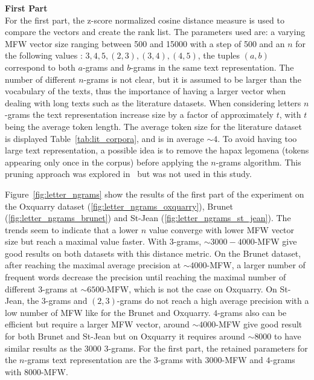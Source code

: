 \textbf{First Part}\\
For the first part, the z-score normalized cosine distance measure is used to compare the vectors and create the rank list.
The parameters used are: a varying MFW vector size ranging between 500 and 15000 with a step of 500 and an $n$ for the following values : $3, 4, 5, (2, 3), (3, 4), (4, 5)$, the tuples $(a, b)$ correspond to both $a$-grams and $b$-grams in the same text representation.
The number of different $n$-grams is not clear, but it is assumed to be larger than the vocabulary of the texts, thus the importance of having a larger vector when dealing with long texts such as the literature datasets.
When considering letters $n$-grams the text representation increase size by a factor of approximately $t$, with $t$ being the average token length.
The average token size for the literature dataset is displayed Table~\ref{tab:lit_corpora}, and is in average $\sim 4$.
To avoid having too large text representation, a possible idea is to remove the hapax legomena (tokens appearing only once in the corpus) before applying the $n$-grams algorithm.
This pruning approach was explored in~\cite{kocher_linking} but was not used in this study.

Figure~\ref{fig:letter_ngrams} show the results of the first part of the experiment on the Oxquarry dataset (\ref{fig:letter_ngrams_oxquarry}), Brunet (\ref{fig:letter_ngrams_brunet}) and St-Jean (\ref{fig:letter_ngrams_st_jean}).
The trends seem to indicate that a lower $n$ value converge with lower MFW vector size but reach a maximal value faster.
With $3$-grams, $\sim 3000-4000$-MFW give good results on both datasets with this distance metric.
On the Brunet dataset, after reaching the maximal average precision at $\sim 4000$-MFW, a larger number of frequent words decrease the precision until reaching the maximal number of different $3$-grams at $\sim 6500$-MFW, which is not the case on Oxquarry.
On St-Jean, the $3$-grams and $(2,3)$-grams do not reach a high average precision with a low number of MFW like for the Brunet and Oxquarry.
$4$-grams also can be efficient but require a larger MFW vector, around $\sim 4000$-MFW give good result for both Brunet and St-Jean but on Oxquarry it requires around $\sim 8000$ to have similar results as the $3000$ $3$-grams.
For the first part, the retained parameters for the $n$-grams text representation are the $3$-grams with $3000$-MFW and $4$-grams with $8000$-MFW.

